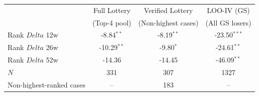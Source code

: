 \begin{tabular}{lccc}
\toprule
 & Full Lottery & Verified Lottery & LOO-IV (GS) \\
 & (Top-4 pool) & (Non-highest cases) & (All GS losers) \\
\midrule
Rank $Delta$ 12w & -8.84$^{**}$ & -8.19$^{**}$ & -23.50$^{***}$ \\
Rank $Delta$ 26w & -10.29$^{**}$ & -9.80$^{*}$ & -24.61$^{**}$ \\
Rank $Delta$ 52w & -14.36 & -14.45 & -46.09$^{**}$ \\
\midrule
$N$ & 331 & 307 & 1327 \\
Non-highest-ranked cases & -- & 183 & -- \\
\bottomrule
\end{tabular}
